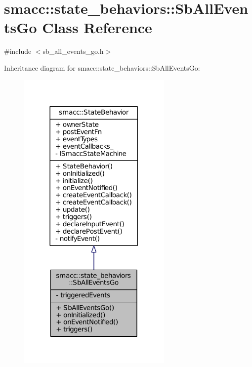 \hypertarget{classsmacc_1_1state__behaviors_1_1SbAllEventsGo}{}\section{smacc\+:\+:state\+\_\+behaviors\+:\+:Sb\+All\+Events\+Go Class Reference}
\label{classsmacc_1_1state__behaviors_1_1SbAllEventsGo}


{\ttfamily \#include $<$sb\+\_\+all\+\_\+events\+\_\+go.\+h$>$}



Inheritance diagram for smacc\+:\+:state\+\_\+behaviors\+:\+:Sb\+All\+Events\+Go\+:
\nopagebreak
\begin{figure}[H]
\begin{center}
\leavevmode
\includegraphics[width=213pt]{classsmacc_1_1state__behaviors_1_1SbAllEventsGo__inherit__graph}
\end{center}
\end{figure}


